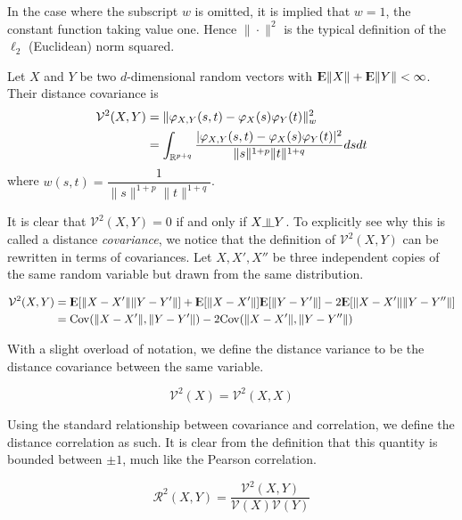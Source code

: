 In the case where the subscript $w$ is omitted, it is implied that $w = 1$, the
constant function taking value one. Hence $\| \cdot \|^2$ is the typical definition
of the $\ell_2$ (Euclidean) norm squared.

\begin{definition} 
Let $X$ and $Y$ be two $d$-dimensional random
vectors with ${\rm I\kern-.3em E}\|X\| + {\rm I\kern-.3em E}\|Y\| < \infty$. Their distance
covariance is
\begin{align*}
\mathcal{V}^2 (X,Y)
&= \| \varphi_{X,Y}(s,t) - \varphi_X(s)\varphi_Y(t) \|_w^2 \\
&= \int_{\mathbb{R}^{p+q}} \dfrac{|\varphi_{X,Y}(s,t) - \varphi_X(s)\varphi_Y(t)|^2}
                         {\|s\|^{1+p} \|t\|^{1+q}} ds dt
\end{align*}
where $w(s,t) = \dfrac{1}{\|s\|^{1+p} \|t\|^{1+q}}$.
\end{definition}

It is clear that $\mathcal{V}^2(X,Y) = 0$ if and only if  $X \indep Y$.
To explicitly see why this is called a distance \emph{covariance}, we
notice that the definition of $\mathcal{V}^2(X,Y)$ can be rewritten in terms
of covariances. Let $X, X', X''$ be three independent copies of the same
random variable but drawn from the same distribution.

\begin{prop} \label{prop:cov}
\begin{align*}
\mathcal{V}^2 (X,Y)
&= {\rm I\kern-.3em E}[\|X - X'\| \|Y - Y'\|]
 + {\rm I\kern-.3em E}[\|X - X'\|] {\rm I\kern-.3em E}[\|Y - Y'\|]
 - 2 {\rm I\kern-.3em E}[ \|X - X'\| \|Y - Y''\| ] \\
&= \mathrm{Cov}( \|X - X'\|, \|Y - Y'\| ) - 2 \mathrm{Cov} (\|X - X'\|, \|Y - Y''\| ) 
\end{align*}
\end{prop}

With a slight overload of notation, we define the distance variance to be
the distance covariance between the same variable. 
\begin{definition}
$$ \mathcal{V}^2 (X) = \mathcal{V}^2 (X,X) $$
\end{definition}

Using the standard relationship between covariance and correlation, we 
define the distance correlation as such. It is clear from the definition that this
quantity is bounded between $\pm 1$, much like the Pearson correlation.

\begin{definition}
$$ \mathcal{R}^2 (X,Y) = \dfrac{\mathcal{V}^2(X,Y)}
                               {\mathcal{V}(X) \mathcal{V}(Y)} $$
\end{definition}

